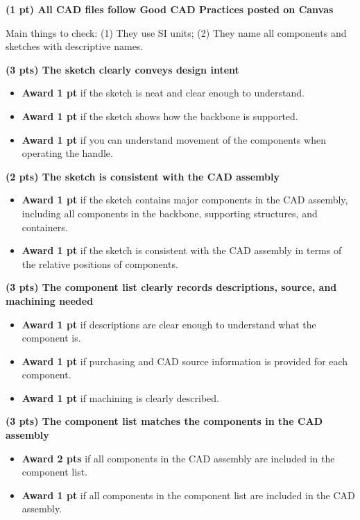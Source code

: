 \documentclass[11pt]{article}
\begin{document}
\newpage

\textbf{(1 pt) All CAD files follow Good CAD Practices posted on Canvas}

Main things to check: (1) They use SI units; (2) They name all components and sketches with descriptive names. 

\textbf{(3 pts) The sketch clearly conveys design intent}

\begin{itemize}
\item \textbf{Award 1 pt} if the sketch is neat and clear enough to understand.
\item \textbf{Award 1 pt} if the sketch shows how the backbone is supported.
\item \textbf{Award 1 pt} if you can understand movement of the components when operating the handle.

\end{itemize}

\textbf{(2 pts) The sketch is consistent with the CAD assembly}
\begin{itemize}
  \item \textbf{Award 1 pt} if the sketch contains major components in the CAD assembly, including all components in the backbone, supporting structures, and containers. 
  \item \textbf{Award 1 pt} if the sketch is consistent with the CAD assembly in terms of the relative positions of components.
\end{itemize}

\textbf{(3 pts) The component list clearly records descriptions, source, and machining needed}

\begin{itemize}
  \item \textbf{Award 1 pt} if descriptions are clear enough to understand what the component is.
  \item \textbf{Award 1 pt} if purchasing and CAD source information is provided for each component.
  \item \textbf{Award 1 pt} if machining is clearly described.
\end{itemize}

\textbf{(3 pts) The component list matches the components in the CAD assembly}

\begin{itemize}
  \item \textbf{Award 2 pts} if all components in the CAD assembly are included in the component list.
  \item \textbf{Award 1 pt} if all components in the component list are included in the CAD assembly.
\end{itemize}
\end{document}
